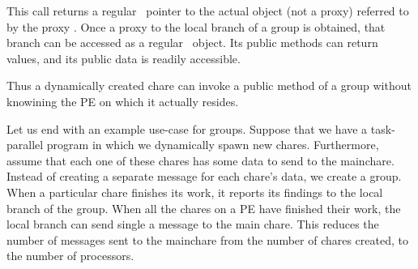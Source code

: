 This call returns a regular \CC\ pointer to the actual object (not a proxy)
referred to by the proxy .  Once a proxy to the
local branch of a group is obtained, that branch can be accessed as a regular
\CC\ object.  Its public methods can return values, and its public data is 
readily accessible.

Thus a dynamically created chare can invoke a public method of a
group without knowining the PE on which it actually resides. 

Let us end with an example use-case for groups.
Suppose that we have a task-parallel program in which we dynamically spawn
new chares. Furthermore, assume that each one of these chares has some data
to send to the mainchare.  Instead of creating a separate message for each 
chare's data, we create a group. When a particular chare
finishes its work, it reports its findings to the local branch of the group.
When all the chares on a PE have finished their work, the local branch
can send single a message to the main chare.  This reduces the number of messages
sent to the mainchare from the number of chares created, to the number of processors. 


